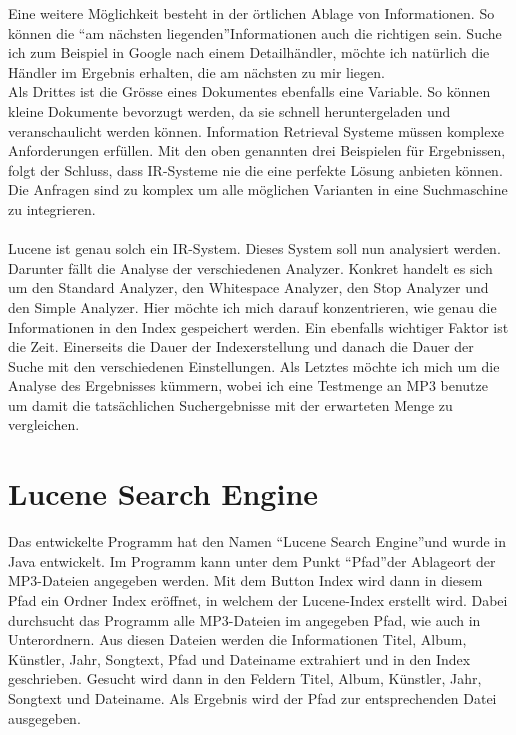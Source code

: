 \documentclass[12pt,a4paper,ngerman]{report}
\begin{document}
Eine weitere Möglichkeit besteht in der örtlichen Ablage von Informationen. So können die \textquotedblleft am nächsten liegenden\textquotedblright Informationen auch die richtigen sein. Suche ich zum Beispiel in Google nach einem Detailhändler, möchte ich natürlich die Händler im Ergebnis erhalten, die am nächsten zu mir liegen.\\
Als Drittes ist die Grösse eines Dokumentes ebenfalls eine Variable. So können kleine Dokumente bevorzugt werden, da sie schnell heruntergeladen und veranschaulicht werden können.
\newpage
Information Retrieval Systeme müssen komplexe Anforderungen erfüllen. Mit den oben genannten drei Beispielen für Ergebnissen, folgt der Schluss, dass IR-Systeme nie die eine perfekte Lösung anbieten können. Die Anfragen sind zu komplex um alle möglichen Varianten in eine Suchmaschine zu integrieren.\\
\\
Lucene ist genau solch ein IR-System. Dieses System soll nun analysiert werden. Darunter fällt die Analyse der verschiedenen Analyzer. Konkret handelt es sich um den Standard Analyzer, den Whitespace Analyzer, den Stop Analyzer und den Simple Analyzer. Hier möchte ich mich darauf konzentrieren, wie genau die Informationen in den Index gespeichert werden. Ein ebenfalls wichtiger Faktor ist die Zeit. Einerseits die Dauer der Indexerstellung und danach die Dauer der Suche mit den verschiedenen Einstellungen. Als Letztes möchte ich mich um die Analyse des Ergebnisses kümmern, wobei ich eine Testmenge an MP3 benutze um damit die tatsächlichen Suchergebnisse mit der erwarteten Menge zu vergleichen.
\section{Lucene Search Engine}
Das entwickelte Programm hat den Namen \textquotedblleft Lucene Search Engine\textquotedblright und wurde in Java entwickelt. Im Programm kann unter dem Punkt \textquotedblleft Pfad\textquotedblright der Ablageort der MP3-Dateien angegeben werden. Mit dem Button Index wird dann in diesem Pfad ein Ordner Index eröffnet, in welchem der Lucene-Index erstellt wird. Dabei durchsucht das Programm alle MP3-Dateien im angegeben Pfad, wie auch in Unterordnern. Aus diesen Dateien werden  die Informationen Titel, Album, Künstler, Jahr, Songtext, Pfad und Dateiname extrahiert und in den Index geschrieben. Gesucht wird dann in den Feldern Titel, Album, Künstler, Jahr, Songtext und Dateiname. Als Ergebnis wird der Pfad zur entsprechenden Datei ausgegeben.
\newpage
\end{document}
